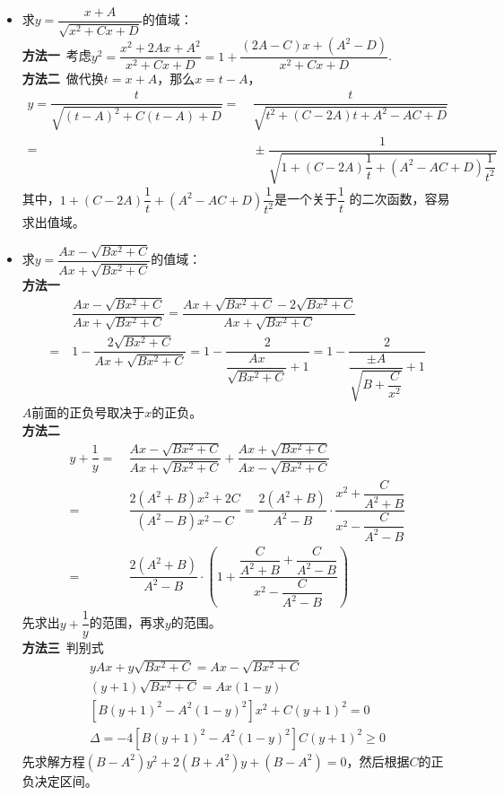 \begin{itemize}[leftmargin=\inteval{\myitemleftmargin}pt,itemsep=
   \inteval{\myitemitempsep}pt,topsep=\inteval{\myitemtopsep}pt]
\item 求$ y=\dfrac{x+A}{\sqrt{x^2+Cx+D}} $的值域：\\
\textbf{方法一}\ 考虑$ y^2=\dfrac{x^2+2Ax+A^2}{x^2+Cx+D}
=1+\dfrac{(2A-C)x+(A^2-D)}{x^2+Cx+D} $. \\
\textbf{方法二}\ 做代换$ t=x+A $，那么$ x=t-A $，
\begin{align*}
    y=\dfrac{t}{\sqrt{(t-A)^2+C(t-A)+D}}=&\ \dfrac{t}{\sqrt{t^2+(C-2A)t+A^2-AC+D}} \\
    =&\  \pm \dfrac{1}{\sqrt{1+(C-2A)\dfrac{1}{t}+(A^2-AC+D)\dfrac{1}{t^2}}}
\end{align*}
其中，$ 1+(C-2A)\dfrac{1}{t}+(A^2-AC+D)\dfrac{1}{t^2} $是一个关于$ \dfrac{1}{t} $
的二次函数，容易求出值域。

\item 求$ y= \dfrac{Ax-\sqrt{Bx^2+C}}{Ax+\sqrt{Bx^2+C}} $的值域：\\
\textbf{方法一}
\begin{align*}
    &\ \dfrac{Ax-\sqrt{Bx^2+C}}{Ax+\sqrt{Bx^2+C}} = 
    \dfrac{Ax+\sqrt{Bx^2+C}-2\sqrt{Bx^2+C}}{Ax+\sqrt{Bx^2+C}} \\
    =&\  1-\dfrac{2\sqrt{Bx^2+C}}{Ax+\sqrt{Bx^2+C}} 
    =1-\dfrac{2}{\dfrac{Ax}{\sqrt{Bx^2+C}}+1} 
    =1-\dfrac{2}{\dfrac{\pm A}{\sqrt{B+\dfrac{C}{x^2}}}+1} 
\end{align*}
$ A $前面的正负号取决于$ x $的正负。\\
\textbf{方法二}
\begin{align*}
    y+\dfrac{1}{y}=&\ \dfrac{Ax-\sqrt{Bx^2+C}}{Ax+\sqrt{Bx^2+C}}+
    \dfrac{Ax+\sqrt{Bx^2+C}}{Ax-\sqrt{Bx^2+C}}   \\
    =&\ \dfrac{2(A^2+B)x^2+2C}{(A^2-B)x^2-C} 
    =   \dfrac{2(A^2+B)}{A^2-B}\cdot
    \dfrac{x^2+\dfrac{C}{A^2+B}}{x^2-\dfrac{C}{A^2-B}} \\
    =&\ \dfrac{2(A^2+B)}{A^2-B}\cdot \left(1+
    \dfrac{\dfrac{C}{A^2+B}+\dfrac{C}{A^2-B}}{x^2-\dfrac{C}{A^2-B}} \right)
\end{align*}
先求出$ y+\dfrac{1}{y} $的范围，再求$ y $的范围。\\
\textbf{方法三}\ 判别式
\begin{gather*}
    yAx+y\sqrt{Bx^2+C}=Ax-\sqrt{Bx^2+C} \\
    (y+1)\sqrt{Bx^2+C}=Ax(1-y)  \\
    [B(y+1)^2-A^2(1-y)^2]x^2+C(y+1)^2=0 \\
    \Delta =-4[B(y+1)^2-A^2(1-y)^2]C(y+1)^2\geq 0
\end{gather*}
先求解方程$ (B-A^2)y^2+2(B+A^2)y+(B-A^2)=0 $，然后根据$ C $的正负决定区间。


\end{itemize}
